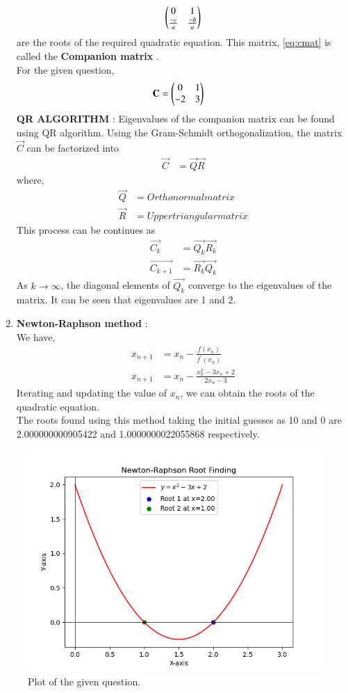 \documentclass[journal]{IEEEtran}
\begin{document}
\begin{enumerate}
\begin{align}
		\begin{pmatrix}0 & 1 \\ \frac{-c}{a} & \frac{-b}{a}\end{pmatrix} \label{eq:cmat}
	\end{align}
	are the roots of the required quadratic equation. This matrix, \eqref{eq:cmat} is called the \textbf{Companion matrix} . \\
	For the given question, 
	\begin{align}
		\mathbf{C} &= \begin{pmatrix}0 & 1 \\ -2 & 3\end{pmatrix}
	\end{align}
	\textbf{QR ALGORITHM} :
	Eigenvalues of the companion matrix can be found using QR algorithm. Using the Gram-Schmidt orthogonalization, the matrix $\vec{C}$ can be factorized into
	\begin{align}
		\vec{C} &= \vec{Q} \vec{R}
	\end{align}
	where, 
	\begin{align}
		\vec{Q} &= Orthonormal matrix \\
		\vec{R} &= Upper triangular matrix
	\end{align}
	This process can be continues as
	\begin{align}
		\vec{C_{k}} &= \vec{Q_{k}} \vec{R_{k}} \\
		\vec{C_{k+1}} &= \vec{R_{k}} \vec{Q_{k}}
	\end{align}
	As $k \to \infty$, the diagonal elements of $\vec{Q_{k}}$ converge to the eigenvalues of the matrix.
	It can be seen that eigenvalues are 1 and 2.
	\item \textbf{Newton-Raphson method} : \\
		We have, 
		\begin{align}
			x_{n+1} &= x_{n} - \frac{f(x_{n})}{f^{\prime}(x_{n})}	\\
			x_{n+1} &= x_{n} - \frac{x_{n}^2 - 3x_{n} + 2}{2 x_{n} - 3}
		\end{align}
		Iterating and updating the value of $x_{n}$, we can obtain the roots of the quadratic equation. \\
		The roots found using this method taking the initial guesses as 10 and 0 are 2.000000000905422 and 1.0000000022055868
 respectively.
 
\end{enumerate}
\begin{figure}[h]
\centering
\includegraphics[width=\columnwidth]{figs/fig.png}
\caption{Plot of the given question.}
\label{fig:Plot1} 
\end{figure}
\end{document}
